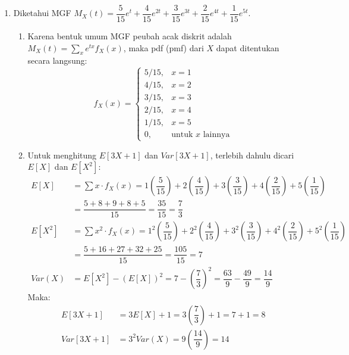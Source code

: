 \documentclass[11pt,letterpaper]{article}
\begin{document}
\begin{enumerate}
  \item Diketahui MGF $M_X(t) = \dfrac{5}{15}e^t + \dfrac{4}{15}e^{2t} + \dfrac{3}{15}e^{3t} + \dfrac{2}{15}e^{4t} + \dfrac{1}{15}e^{5t}$.
        \begin{enumerate}[label=\alph*.]
          \item Karena bentuk umum MGF peubah acak diskrit adalah $M_X(t) = \sum_{x} e^{tx} f_X(x)$, maka pdf (pmf) dari $X$ dapat ditentukan secara langsung:
                \[ f_X(x) = \begin{cases}
                    5/15, & x = 1                           \\
                    4/15, & x = 2                           \\
                    3/15, & x = 3                           \\
                    2/15, & x = 4                           \\
                    1/15, & x = 5                           \\
                    0,    & \text{untuk } x \text{ lainnya}
                  \end{cases} \]
          \item Untuk menghitung $E[3X+1]$ dan $Var[3X+1]$, terlebih dahulu dicari $E[X]$ dan $E[X^2]$:
                \begin{align*}
                  E[X]   & = \sum x \cdot f_X(x) = 1\left(\dfrac{5}{15}\right) + 2\left(\dfrac{4}{15}\right) + 3\left(\dfrac{3}{15}\right) + 4\left(\dfrac{2}{15}\right) + 5\left(\dfrac{1}{15}\right)             \\
                         & = \dfrac{5+8+9+8+5}{15} = \dfrac{35}{15} = \dfrac{7}{3}                                                                                                                                 \\
                  E[X^2] & = \sum x^2 \cdot f_X(x) = 1^2\left(\dfrac{5}{15}\right) + 2^2\left(\dfrac{4}{15}\right) + 3^2\left(\dfrac{3}{15}\right) + 4^2\left(\dfrac{2}{15}\right) + 5^2\left(\dfrac{1}{15}\right) \\
                         & = \dfrac{5+16+27+32+25}{15} = \dfrac{105}{15} = 7                                                                                                                                       \\
                  Var(X) & = E[X^2] - (E[X])^2 = 7 - \left(\dfrac{7}{3}\right)^2 = \dfrac{63}{9} - \dfrac{49}{9} = \dfrac{14}{9}
                \end{align*}
                Maka:
                \begin{align*}
                  E[3X+1]   & = 3E[X] + 1 = 3\left(\dfrac{7}{3}\right) + 1 = 7 + 1 = 8 \\
                  Var[3X+1] & = 3^2 Var(X) = 9\left(\dfrac{14}{9}\right) = 14
                \end{align*}
        \end{enumerate}
        \vspace{0.3cm}


\end{enumerate}
\end{document}
